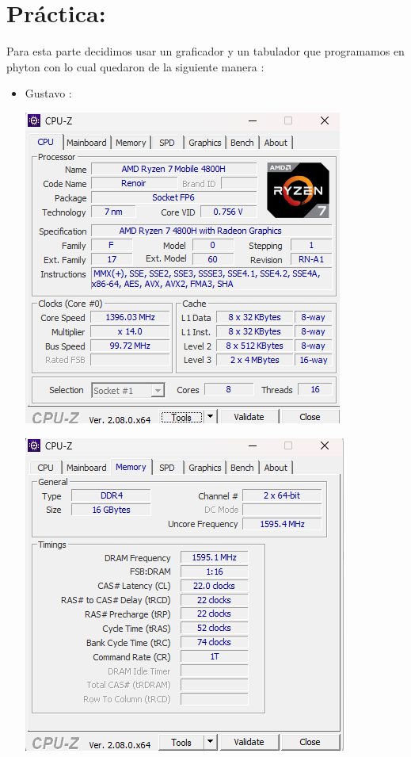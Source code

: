 \documentclass[12pt]{article}
\begin{document}
\section{Práctica:}
Para esta parte decidimos usar un graficador y un tabulador que programamos en phyton con lo cual quedaron de la siguiente manera :
 \begin{itemize}

 
     \item Gustavo :
    
     
      \begin{center}
         \includegraphics[width=0.6\linewidth]{Practica3//ImaP3/e2.png}
     \end{center}
      \begin{center}
         \includegraphics[width=0.6\linewidth]{Practica3//ImaP3/e.png}
     \end{center}
 \begin{center}

\end{center}
\end{itemize}
\end{document}
